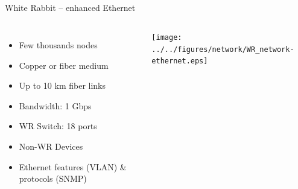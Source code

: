 \documentclass[compress,red]{beamer}
\begin{document}
\subsection{}
\begin{frame}{White Rabbit -- enhanced Ethernet}

\begin{columns}[c]
 

  \begin{itemize}
    \item Few thousands nodes
    \item Copper or fiber medium
    \item Up to 10 km fiber links
    \item Bandwidth: 1 Gbps
    \item WR Switch: 18 ports
    \item Non-WR Devices
    \item Ethernet features (VLAN) \& protocols (SNMP)
  \end{itemize}

    \begin{center}
    \texttt{[image: ../../figures/network/WR\_network-ethernet.eps]}
    \end{center}
\end{columns}

\end{frame}
\end{document}
